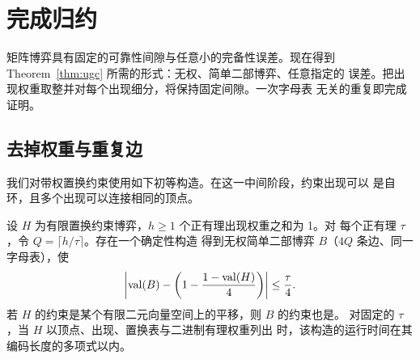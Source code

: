 \section{完成归约}
\label{sec:finish}

矩阵博弈具有固定的可靠性间隙与任意小的完备性误差。现在得到
Theorem~\ref{thm:ugc} 所需的形式：无权、简单二部博弈、任意指定的
误差。把出现权重取整并对每个出现细分，将保持固定间隙。一次字母表
无关的重复即完成证明。

\subsection{去掉权重与重复边}

我们对带权置换约束使用如下初等构造。在这一中间阶段，约束出现可以
是自环，且多个出现可以连接相同的顶点。

\begin{lemma}[取整与细分]
\label{lem:unweighted-subdivision}
设 $H$ 为有限置换约束博弈，$h\ge1$ 个正有理出现权重之和为 1。对
每个正有理 $\tau$，令 $Q=\lceil h/\tau\rceil$。存在一个确定性构造
得到无权简单二部博弈 $B$（$4Q$ 条边、同一字母表），使
\begin{equation}
 \left|\operatorname{val}(B)-\left(1-\frac{1-\operatorname{val}(H)}4\right)\right|
 \le\frac{\tau}{4}.
 \label{eq:rounded-subdivision-value}
\end{equation}
若 $H$ 的约束是某个有限二元向量空间上的平移，则 $B$ 的约束也是。
对固定的 $\tau$，当 $H$ 以顶点、出现、置换表与二进制有理权重列出
时，该构造的运行时间在其编码长度的多项式以内。
\end{lemma}

